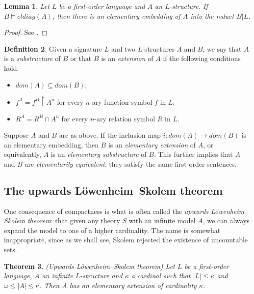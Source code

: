 \documentclass[10pt, a4paper, oneside]{article}
\newtheorem{thm}{Theorem}[section]
\theoremstyle{definition}
\newtheorem{dfn}[thm]{Definition}
\theoremstyle{remark}
\theoremstyle{plain}
\newtheorem{lem}[thm]{Lemma}
\theoremstyle{plain}
\begin{document}
\begin{lem}
    \label{eldiag_lem}
    Let $L$ be a first-order language and $A$ an $L$-structure. If $B \models
    eldiag(A)$, then there is an elementary embedding of $A$ into the reduct
    $B | L$.
\end{lem}

\begin{proof}
    See \citealt[p. 49]{hodges1997}.
\end{proof}

\begin{dfn}
    Given a signature $L$ and two $L$-structures $A$ and $B$, we say that
    $A$ is a \emph{substructure} of $B$ or that $B$ is an \emph{extension} of
    $A$ if the following conditions hold:
    
    \begin{itemize}
        \item $dom(A) \subseteq dom(B)$;
        \item $f^A = f^B \restriction A^n$ for every $n$-ary function symbol $f$
            in $L$;
        \item $R^A = R^B \cap A^n$ for every $n$-ary relation symbol $R$
            in $L$.
    \end{itemize}
    
    Suppose $A$ and $B$ are as above. If the inclusion map $i : dom(A)
    \rightarrow dom(B)$ is an elementary embedding, then $B$ is an
    \emph{elementary extension} of $A$, or equivalently, $A$ is an
    \emph{elementary substructure} of $B$. This further implies that $A$ and $B$
    are \emph{elementarily equivalent}: they satisfy the same first-order
    sentences.
\end{dfn}

\subsection{The upwards Löwenheim--Skolem theorem}

One consequence of compactness is what is often called the \emph{upwards
Löwenheim--Skolem theorem}: that given any theory $S$ with an infinite model
$A$, we can always expand the model to one of a higher cardinality. The name is
somewhat inappropriate, since as we shall see, Skolem rejected the existence of
uncountable sets.

\begin{thm}
    \label{up_lst}
    (Upwards Löwenheim--Skolem theorem) Let $L$ be a first-order language, $A$
    an infinite $L$-structure and $\kappa$ a cardinal such that $|L| \leq
    \kappa$ and $\omega \leq |A| \leq \kappa$. Then $A$ has an elementary
    extension of cardinality $\kappa$.
\end{thm}
\end{document}
